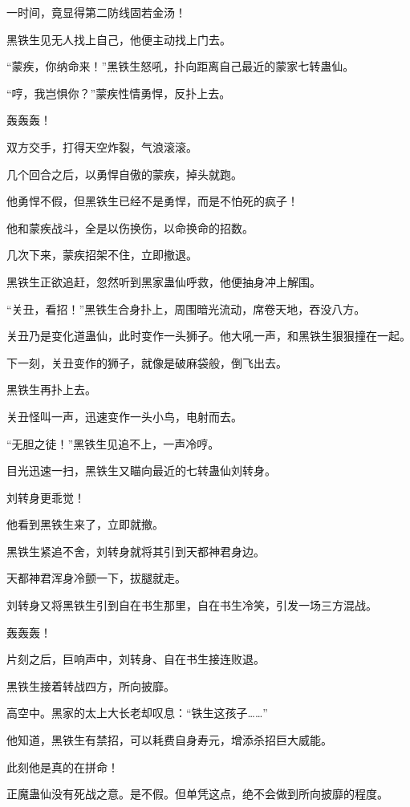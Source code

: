 \begin{this_body}
一时间，竟显得第二防线固若金汤！

黑铁生见无人找上自己，他便主动找上门去。

“蒙疾，你纳命来！”黑铁生怒吼，扑向距离自己最近的蒙家七转蛊仙。

“哼，我岂惧你？”蒙疾性情勇悍，反扑上去。

轰轰轰！

双方交手，打得天空炸裂，气浪滚滚。

几个回合之后，以勇悍自傲的蒙疾，掉头就跑。

他勇悍不假，但黑铁生已经不是勇悍，而是不怕死的疯子！

他和蒙疾战斗，全是以伤换伤，以命换命的招数。

几次下来，蒙疾招架不住，立即撤退。

黑铁生正欲追赶，忽然听到黑家蛊仙呼救，他便抽身冲上解围。

“关丑，看招！”黑铁生合身扑上，周围暗光流动，席卷天地，吞没八方。

关丑乃是变化道蛊仙，此时变作一头狮子。他大吼一声，和黑铁生狠狠撞在一起。

下一刻，关丑变作的狮子，就像是破麻袋般，倒飞出去。

黑铁生再扑上去。

关丑怪叫一声，迅速变作一头小鸟，电射而去。

“无胆之徒！”黑铁生见追不上，一声冷哼。

目光迅速一扫，黑铁生又瞄向最近的七转蛊仙刘转身。

刘转身更乖觉！

他看到黑铁生来了，立即就撤。

黑铁生紧追不舍，刘转身就将其引到天都神君身边。

天都神君浑身冷颤一下，拔腿就走。

刘转身又将黑铁生引到自在书生那里，自在书生冷笑，引发一场三方混战。

轰轰轰！

片刻之后，巨响声中，刘转身、自在书生接连败退。

黑铁生接着转战四方，所向披靡。

高空中。黑家的太上大长老却叹息：“铁生这孩子……”

他知道，黑铁生有禁招，可以耗费自身寿元，增添杀招巨大威能。

此刻他是真的在拼命！

正魔蛊仙没有死战之意。是不假。但单凭这点，绝不会做到所向披靡的程度。


\end{this_body}
